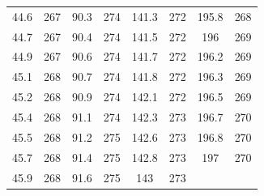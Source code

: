 \documentclass[12pt]{ctexart}
\numberwithin{equation}{section}
\begin{document}
\begin{longtable}{cc|cc|cc|cc}
44.6  &  267  &  90.3  &  274  &  141.3  &  272  &  195.8  &  268  \\
44.7  &  267  &  90.4  &  274  &  141.5  &  272  &  196  &  269  \\
44.9  &  267  &  90.6  &  274  &  141.7  &  272  &  196.2  &  269  \\
45.1  &  268  &  90.7  &  274  &  141.8  &  272  &  196.3  &  269  \\
45.2  &  268  &  90.9  &  274  &  142.1  &  272  &  196.5  &  269  \\
45.4  &  268  &  91.1  &  274  &  142.3  &  273  &  196.7  &  270  \\
45.5  &  268  &  91.2  &  275  &  142.6  &  273  &  196.8  &  270  \\
45.7  &  268  &  91.4  &  275  &  142.8  &  273  &  197  &  270  \\
45.9  &  268  &  91.6  &  275  &  143  &  273  \\

\end{longtable}
\end{document}
